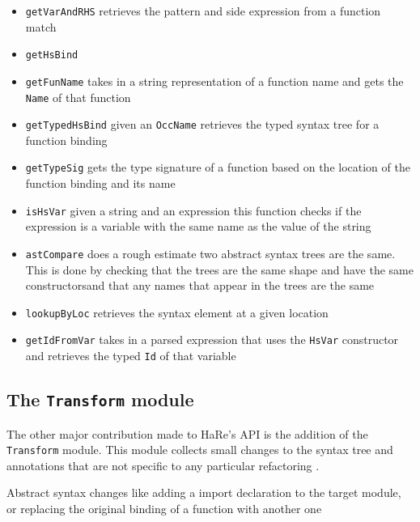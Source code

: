 \begin{itemize}
\item \texttt{getVarAndRHS} retrieves the pattern and \DIFdelbegin {}\DIFdelend \DIFaddbegin {}\DIFaddend side expression from a function match
\item \texttt{getHsBind}
\item \texttt{getFunName} takes in a string representation of a function name and gets the \texttt{Name} of that function
\item \texttt{getTypedHsBind} given an \texttt{OccName} retrieves the typed syntax tree for a function binding
\item \texttt{getTypeSig} gets the type signature of a function based on the location of the function binding and its name
\item \texttt{isHsVar} given a string and an expression this function checks if the expression is a variable with the same name as the value of the string
\item \texttt{astCompare} does a rough estimate \DIFdelbegin {}\DIFdelend \DIFaddbegin {}\DIFaddend two abstract syntax trees are the same. This is done by checking that the trees are the same shape and have the same constructors\DIFaddbegin \DIFadd{, }\DIFaddend and that any names that appear in the trees are the same 
\item \texttt{lookupByLoc} retrieves the syntax element at a given location
\item \texttt{getIdFromVar} takes in a parsed expression that uses the \texttt{HsVar} constructor and retrieves the typed \texttt{Id} of that variable
\end{itemize}


\subsection{The \texttt{Transform} module}

The other major contribution made to HaRe's API is the addition of the \texttt{Transform} module. This module collects small changes to the syntax tree and annotations that are not specific to any particular refactoring \DIFaddbegin {}\DIFaddend .

Abstract syntax changes like adding a import declaration to the target module, or replacing the original binding of a function with another one \DIFdelbegin {}%

